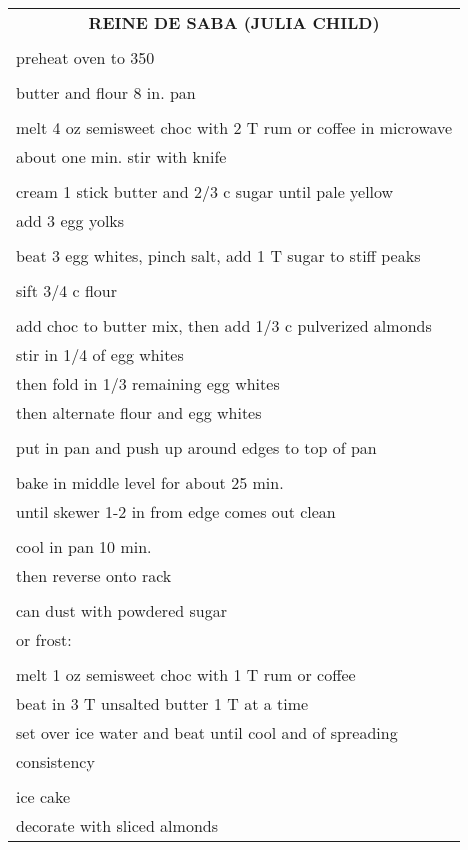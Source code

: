 \documentclass[8pt]{report}
\begin{document}
\begin{tabular}{|l|} \hline	%
 
\multicolumn{1}{|c|}{\textbf{REINE DE SABA (JULIA CHILD)}}
\\
\\

\index{desserts!reine de saba (julia child)} \index{reine de saba}
\index{chocolate!reine de saba}





preheat oven to 350\\
\\
butter and flour 8 in. pan\\
\\
melt 4 oz semisweet choc with 2 T rum or coffee in microwave\\
about one min. stir with knife\\
\\
cream 1 stick butter and 2/3 c sugar until pale yellow\\
add 3 egg yolks\\
\\
beat 3 egg whites, pinch salt, add 1 T sugar to stiff peaks\\
\\
sift 3/4 c flour\\
\\
add choc to butter mix, then add 1/3 c pulverized almonds\\
stir in 1/4 of egg whites\\
then fold in 1/3 remaining egg whites\\
then alternate flour and egg whites\\
\\
put in pan and push up around edges to top of pan\\
\\
bake in middle level for about 25 min.\\
until skewer 1-2 in from edge comes out clean\\
\\
cool in pan 10 min.\\
then reverse onto rack\\
\\
can dust with powdered sugar\\
or frost:\\
\\
melt 1 oz semisweet choc with 1 T rum or coffee\\
beat in 3 T unsalted butter 1 T at a time\\
set over ice water and beat until cool and of spreading\\
consistency\\
\\
ice cake\\
decorate with sliced almonds\\



\hline

\end{tabular}
\end{document}
